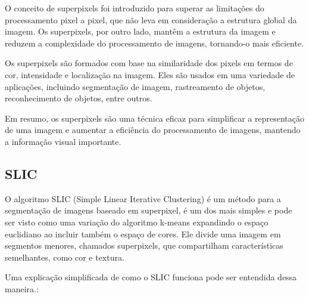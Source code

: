 O conceito de superpixels foi introduzido para superar as limitações
do processamento pixel a pixel, que não leva em consideração a
estrutura global da imagem. Os superpixels, por outro lado, mantêm a
estrutura da imagem e reduzem a complexidade do processamento de
imagens, tornando-o mais eficiente.

Os superpixels são formados com base na similaridade dos pixels em
termos de cor, intensidade e localização na imagem. Eles são usados em
uma variedade de aplicações, incluindo segmentação de imagem,
rastreamento de objetos, reconhecimento de objetos, entre outros.

Em resumo, os superpixels são uma técnica eficaz para simplificar a
representação de uma imagem e aumentar a eficiência do processamento
de imagens, mantendo a informação visual importante.

\subsection{SLIC}\label{sec:teorica-superpixel-slic}


O algoritmo SLIC (Simple Linear Iterative Clustering) é um método para
a segmentação de imagens baseado em superpixel, é um dos mais simples
e pode ser visto como uma variação do algoritmo k-means expandindo o
espaço euclidiano ao incluir também o espaço de cores. Ele divide uma
imagem em segmentos menores, chamados superpixels, que compartilham
características semelhantes, como cor e textura.

Uma explicação simplificada de como o SLIC funciona pode ser entendida
dessa maneira.:

